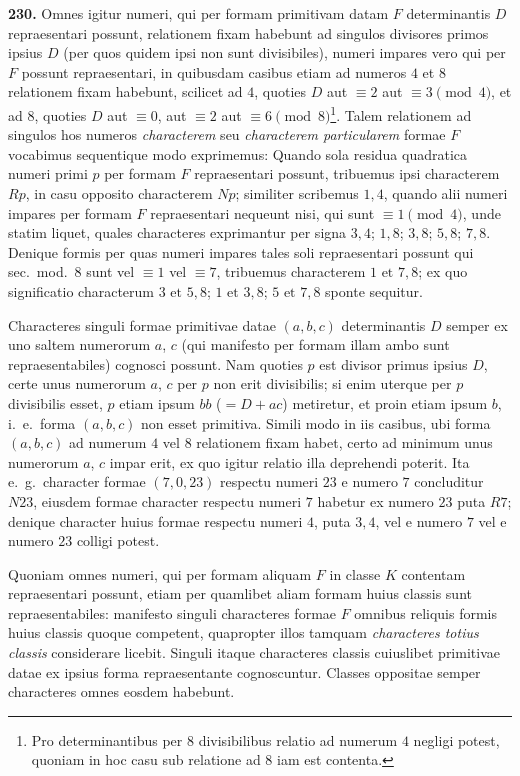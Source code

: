 \documentclass[12pt,a4paper]{article}
\theoremstyle{plain}
\theoremstyle{definition}
\theoremstyle{remark}
\begin{document}
\textbf{230.}
Omnes igitur numeri, qui per formam primitivam datam $F$ determinantis $D$ repraesentari possunt, relationem fixam habebunt ad singulos divisores primos ipsius $D$ (per quos quidem ipsi non sunt divisibiles), numeri impares vero qui per $F$ possunt repraesentari, in quibusdam casibus etiam ad numeros $4$ et $8$ relationem fixam habebunt, scilicet ad $4$, quoties $D$ aut $\equiv 2$ aut $\equiv 3\pmod{4}$, et ad $8$, quoties $D$ aut $\equiv 0$, aut $\equiv 2$ aut $\equiv 6\pmod{8}$\footnote{Pro determinantibus per $8$ divisibilibus relatio ad numerum $4$ negligi potest, quoniam in hoc casu sub relatione ad $8$ iam est contenta.}. Talem relationem ad singulos hos numeros \emph{characterem} seu \emph{characterem particularem} formae $F$ vocabimus sequentique modo exprimemus: Quando sola residua quadratica numeri primi $p$ per formam $F$ repraesentari possunt, tribuemus ipsi characterem $Rp$, in casu opposito characterem $Np$; similiter scribemus $1,4$, quando alii numeri impares per formam $F$ repraesentari nequeunt nisi, qui sunt $\equiv 1\pmod{4}$, unde statim liquet, quales characteres exprimantur per signa $3,4$; $1,8$; $3,8$; $5,8$; $7,8$. Denique formis per quas numeri impares tales soli repraesentari possunt qui sec.\ mod.\ $8$ sunt vel $\equiv 1$ vel $\equiv 7$, tribuemus characterem $1\text{ et }7,8$; ex quo significatio characterum $3\text{ et }5,8$; $1\text{ et }3,8$; $5\text{ et }7,8$ sponte sequitur.

Characteres singuli formae primitivae datae $(a,b,c)$ determinantis $D$ semper ex uno saltem numerorum $a$, $c$ (qui manifesto per formam illam ambo sunt repraesentabiles) cognosci possunt. Nam quoties $p$ est divisor primus ipsius $D$, certe unus numerorum $a$, $c$ per $p$ non erit divisibilis; si enim uterque per $p$ divisibilis esset, $p$ etiam ipsum $bb$ ($=D+ac$) metiretur, et proin etiam ipsum $b$, i.\ e.\ forma $(a,b,c)$ non esset primitiva. Simili modo in iis casibus, ubi forma $(a,b,c)$ ad numerum $4$ vel $8$ relationem fixam habet, certo ad minimum unus numerorum $a$, $c$ impar erit, ex quo igitur relatio illa deprehendi poterit. Ita e.\ g.\ character formae $(7,0,23)$ respectu numeri $23$ e numero $7$ concluditur $N23$, eiusdem formae character respectu numeri $7$ habetur ex numero $23$ puta $R7$; denique character huius formae respectu numeri $4$, puta $3,4$, vel e numero $7$ vel e numero $23$ colligi potest.

Quoniam omnes numeri, qui per formam aliquam $F$ in classe $K$ contentam repraesentari possunt, etiam per quamlibet aliam formam huius classis sunt repraesentabiles: manifesto singuli characteres formae $F$ omnibus reliquis formis huius classis quoque competent, quapropter illos tamquam \emph{characteres totius classis} considerare licebit. Singuli itaque characteres classis cuiuslibet primitivae datae ex ipsius forma repraesentante cognoscuntur. Classes oppositae semper characteres omnes eosdem habebunt.
\end{document}
